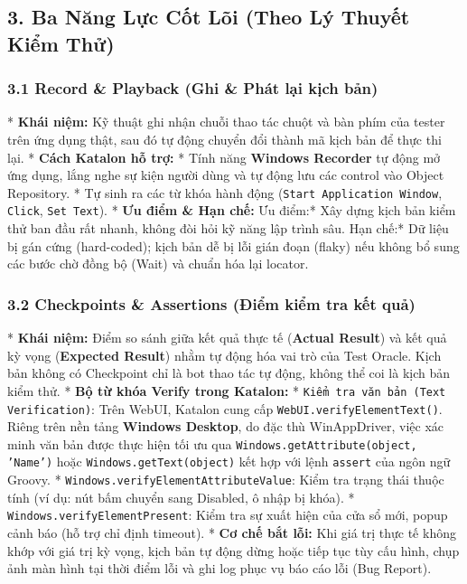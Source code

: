 {\subsection{3. Ba Năng Lực Cốt Lõi (Theo Lý Thuyết Kiểm Thử)}

\subsubsection{3.1 Record \& Playback (Ghi \& Phát lại kịch bản)}
* \textbf{Khái niệm:} Kỹ thuật ghi nhận chuỗi thao tác chuột và bàn phím của tester trên ứng dụng thật, sau đó tự động chuyển đổi thành mã kịch bản để thực thi lại.
* \textbf{Cách Katalon hỗ trợ:}
  * Tính năng \textbf{Windows Recorder} tự động mở ứng dụng, lắng nghe sự kiện người dùng và tự động lưu các control vào Object Repository.
  * Tự sinh ra các từ khóa hành động (\texttt{Start Application Window}, \texttt{Click}, \texttt{Set Text}).
* \textbf{Ưu điểm & Hạn chế:}
  \textit{ }Ưu điểm:* Xây dựng kịch bản kiểm thử ban đầu rất nhanh, không đòi hỏi kỹ năng lập trình sâu.
  \textit{ }Hạn chế:* Dữ liệu bị gán cứng (hard-coded); kịch bản dễ bị lỗi gián đoạn (flaky) nếu không bổ sung các bước chờ đồng bộ (Wait) và chuẩn hóa lại locator.

\subsubsection{3.2 Checkpoints \& Assertions (Điểm kiểm tra kết quả)}
* \textbf{Khái niệm:} Điểm so sánh giữa kết quả thực tế (\textbf{Actual Result}) và kết quả kỳ vọng (\textbf{Expected Result}) nhằm tự động hóa vai trò của Test Oracle. Kịch bản không có Checkpoint chỉ là bot thao tác tự động, không thể coi là kịch bản kiểm thử.
* \textbf{Bộ từ khóa Verify trong Katalon:}
  * \texttt{Kiểm tra văn bản (Text Verification)}: Trên WebUI, Katalon cung cấp \texttt{WebUI.verifyElementText()}. Riêng trên nền tảng \textbf{Windows Desktop}, do đặc thù WinAppDriver, việc xác minh văn bản được thực hiện tối ưu qua \texttt{Windows.getAttribute(object, 'Name')} hoặc \texttt{Windows.getText(object)} kết hợp với lệnh \texttt{assert} của ngôn ngữ Groovy.
  * \texttt{Windows.verifyElementAttributeValue}: Kiểm tra trạng thái thuộc tính (ví dụ: nút bấm chuyển sang Disabled, ô nhập bị khóa).
  * \texttt{Windows.verifyElementPresent}: Kiểm tra sự xuất hiện của cửa sổ mới, popup cảnh báo (hỗ trợ chỉ định timeout).
* \textbf{Cơ chế bắt lỗi:} Khi giá trị thực tế không khớp với giá trị kỳ vọng, kịch bản tự động dừng hoặc tiếp tục tùy cấu hình, chụp ảnh màn hình tại thời điểm lỗi và ghi log phục vụ báo cáo lỗi (Bug Report).

}
